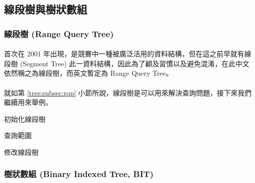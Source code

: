 \documentclass[12pt,a4paper,oneside]{report}
\begin{document}
\begin{CJK}{UTF8}{bkai}
\subsection{線段樹與樹狀數組}

\subsubsection{線段樹 (Range Query Tree)}

\paragraph{}首次在 2001 年出現，是競賽中一種被廣泛活用的資料結構，但在這之前早就有線段樹 (Segment Tree) 此一資料結構，因此為了顧及習慣以及避免混淆，在此中文依然稱之為線段樹，而英文暫定為 Range Query Tree。

\paragraph{}就如第 \ref{tree:subsec:rqp} 小節所說，線段樹是可以用來解決查詢問題，接下來我們繼續用來舉例。

\begin{algorithm}[h]
\begin{algorithmic}[1]
\Statex
\EndFunction
\end{algorithmic}
\caption{初始化線段樹}
\label{tree:alg:seg:init}
\end{algorithm}

\begin{algorithm}[h]
\begin{algorithmic}[1]
\Statex
\EndFunction
\end{algorithmic}
\caption{查詢範圍}
\label{tree:alg:seg:query}
\end{algorithm}

\begin{algorithm}[h]
\begin{algorithmic}[1]
\Statex
\EndFunction
\end{algorithmic}
\caption{修改線段樹}
\label{tree:alg:seg:modify}
\end{algorithm}

\subsubsection{樹狀數組 (Binary Indexed Tree, BIT)}


\end{CJK}
\end{document}
